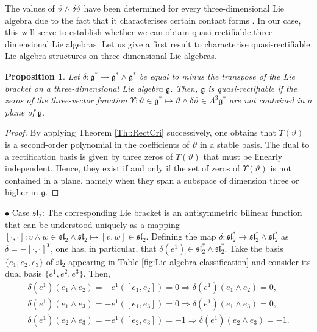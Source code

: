 \documentclass[12pt]{article}
\theoremstyle{plain}
\newtheorem{proposition}[theorem]{Proposition}
\theoremstyle{definition}
\numberwithin{equation}{section}
\begin{document}

 The values of $\vartheta \wedge \delta \vartheta$ have been determined for every three-dimensional Lie algebra due to the fact that it characterises certain contact forms \cite{LR22}. In our case, this will serve to establish whether we can obtain quasi-rectifiable three-dimensional Lie algebras. Let us give a first result to characterise quasi-rectifiable Lie algebra structures on three-dimensional Lie algebras. 

\begin{proposition} Let $\delta:\mathfrak{g}^*\rightarrow \mathfrak{g}^*\wedge\mathfrak{g}^*$ be equal to minus the transpose of the Lie bracket on a three-dimensional Lie algebra $\mathfrak{g}$. Then,  $\mathfrak{g}$ is quasi-rectifiable if the zeros of the three-vector function $\Upsilon:\vartheta\in \mathfrak{g}^*\mapsto \vartheta\wedge \delta \vartheta\in  \Lambda^3\mathfrak{g}^*$ are not contained in a plane of $\mathfrak{g}$. 
\end{proposition} 
\begin{proof} By applying  Theorem \ref{Th::RectCri} successively, one obtains that $\Upsilon(\vartheta)$ is a second-order polynomial in the coefficients of $\vartheta$ in a stable basis. The dual to a rectification basis is given by three zeros of  $\Upsilon(\vartheta)$ that must be linearly independent. Hence, they exist if and only if the set of zeros of $\Upsilon (\vartheta)$ is not contained in a plane, namely when they span a subspace of dimension three or higher in $\mathfrak{g}$. 
\end{proof}
$\bullet$ Case $\mathfrak{sl}_2$: 
The corresponding Lie bracket is an antisymmetric bilinear function that can be understood uniquely as a mapping $[\cdot,\cdot]:v\wedge w\in\mathfrak{sl}_2\wedge \mathfrak{sl}_2\mapsto [v,w]\in \mathfrak{sl}_2$. Defining the map $\delta:\mathfrak{sl}_2^*\rightarrow \mathfrak{sl}_2^*\wedge\mathfrak{sl}_2^*$ as $\delta = -[\cdot,\cdot]^T$, one has, in particular, that $\delta(e^1)\in \mathfrak{sl}_2^*\wedge \mathfrak{sl}_2^*$. Take the basis $\{e_1,e_2,e_3\}$ of $\mathfrak{sl}_2$ appearing in Table \ref{fig:Lie-algebra-classification} and consider its dual basis $\{e^1,e^2,e^3\}$. Then,
$$
\begin{gathered}
\delta(e^1)(e_1\wedge e_2)=-e^1([e_1,e_2])=0\Rightarrow \delta(e^1)(e_1\wedge e_2)=0,\\
\delta(e^1)(e_1\wedge e_3)=-e^1([e_1,e_3])=0\Rightarrow \delta(e^1)(e_1\wedge e_3)=0,\\
\delta(e^1)(e_2\wedge e_3)=-e^1([e_2,e_3])=-1\Rightarrow \delta(e^1)(e_2\wedge e_3)=-1.    
\end{gathered}
$$
\end{document}
